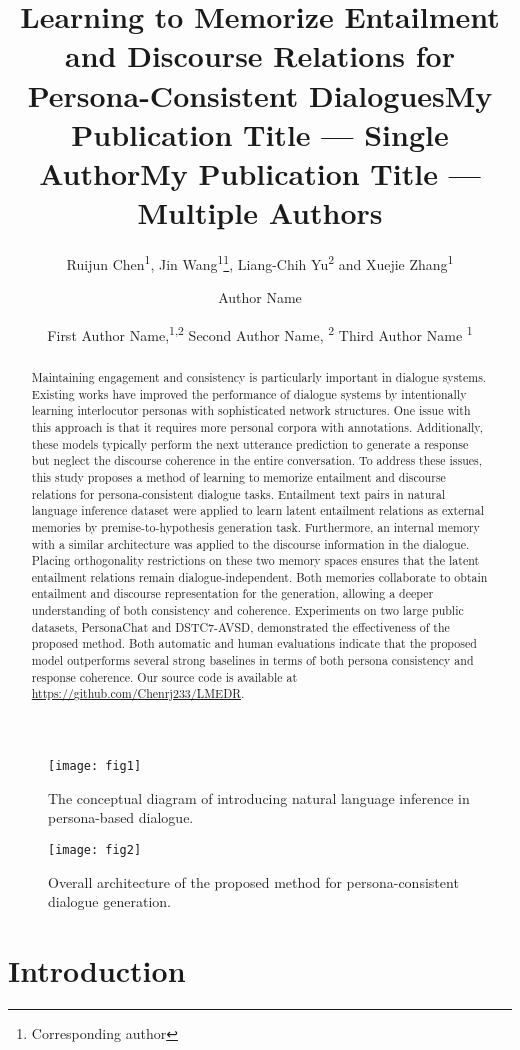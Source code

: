 \documentclass[letterpaper]{article} \usepackage{aaai23}  \usepackage{times}  \usepackage{helvet}  \usepackage{courier}  \usepackage[hyphens]{url}  \usepackage{graphicx} \urlstyle{rm} \def\UrlFont{\rm}  \usepackage{natbib}  \usepackage{caption} \frenchspacing  \setlength{\pdfpagewidth}{8.5in}  \setlength{\pdfpageheight}{11in}  \usepackage{algorithm}
\title{Learning to Memorize Entailment and Discourse Relations for Persona-Consistent Dialogues}
\author{
Ruijun Chen\textsuperscript{\rm 1},
    Jin Wang\textsuperscript{\rm 1}\thanks{Corresponding author},
    Liang-Chih Yu\textsuperscript{\rm 2} and Xuejie Zhang\textsuperscript{\rm 1}
}
\title{My Publication Title --- Single Author}
\author {
    Author Name
}
\title{My Publication Title --- Multiple Authors}
\author {
First Author Name,\textsuperscript{\rm 1,\rm 2}
    Second Author Name, \textsuperscript{\rm 2}
    Third Author Name \textsuperscript{\rm 1}
}
\begin{document}
\maketitle

\begin{abstract}
Maintaining engagement and consistency is particularly important in dialogue systems. Existing works have improved the performance of dialogue systems by intentionally learning interlocutor personas with sophisticated network structures. One issue with this approach is that it requires more personal corpora with annotations. Additionally, these models typically perform the next utterance prediction to generate a response but neglect the discourse coherence in the entire conversation. To address these issues, this study proposes a method of learning to memorize entailment and discourse relations for persona-consistent dialogue tasks. Entailment text pairs in natural language inference dataset were applied to learn latent entailment relations as external memories by premise-to-hypothesis generation task. Furthermore, an internal memory with a similar architecture was applied to the discourse information in the dialogue. Placing orthogonality restrictions on these two memory spaces ensures that the latent entailment relations remain dialogue-independent. Both memories collaborate to obtain entailment and discourse representation for the generation, allowing a deeper understanding of both consistency and coherence. Experiments on two large public datasets, PersonaChat and DSTC7-AVSD, demonstrated the effectiveness of the proposed method. Both automatic and human evaluations indicate that the proposed model outperforms several strong baselines in terms of both persona consistency and response coherence. Our source code is available at \url{https://github.com/Chenrj233/LMEDR}.
\end{abstract}

\begin{figure}[t]
\centering
\texttt{[image: fig1]} \caption{The conceptual diagram of introducing natural language inference in persona-based dialogue.}
\label{fig1}
\end{figure}
\begin{figure*}[t]
\centering
\texttt{[image: fig2]} \caption{Overall architecture of the proposed method for persona-consistent dialogue generation.}
\label{fig2}
\end{figure*}

\section{Introduction}
\end{document}
